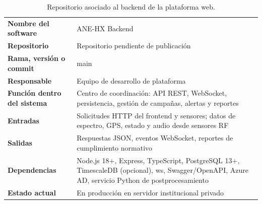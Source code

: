 \begin{table}[H]
\centering
\caption{Repositorio asociado al backend de la plataforma web.}
\label{tab:repo_backend}
\begin{tabularx}{\textwidth}{>{\bfseries}l X}
\toprule
Nombre del software & ANE-HX Backend \\
Repositorio & Repositorio pendiente de publicación \\
Rama, versión o commit & main \\
Responsable & Equipo de desarrollo de plataforma \\
Función dentro del sistema & Centro de coordinación: API REST, WebSocket,
persistencia, gestión de campañas, alertas y reportes \\
Entradas & Solicitudes HTTP del frontend y sensores; datos de espectro, GPS,
estado y audio desde sensores RF \\
Salidas & Respuestas JSON, eventos WebSocket, reportes de cumplimiento
normativo \\
Dependencias & Node.js 18+, Express, TypeScript, PostgreSQL 13+, TimescaleDB
(opcional), ws, Swagger/OpenAPI, Azure AD, servicio Python de
postprocesamiento \\
Estado actual & En producción en servidor institucional privado \\
\bottomrule
\end{tabularx}
\end{table}
